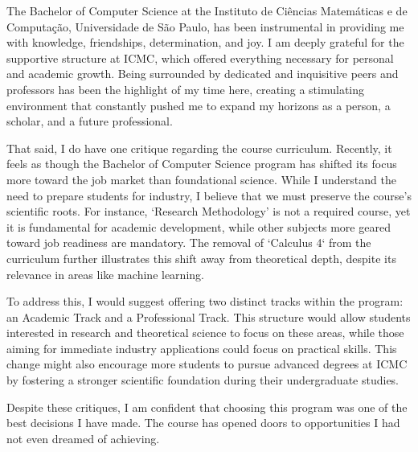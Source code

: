 The Bachelor of Computer Science at the Instituto de Ciências Matemáticas e de Computação, Universidade de São Paulo, has been instrumental in providing me with knowledge, friendships, determination, and joy. I am deeply grateful for the supportive structure at ICMC, which offered everything necessary for personal and academic growth. Being surrounded by dedicated and inquisitive peers and professors has been the highlight of my time here, creating a stimulating environment that constantly pushed me to expand my horizons as a person, a scholar, and a future professional.

That said, I do have one critique regarding the course curriculum. Recently, it feels as though the Bachelor of Computer Science program has shifted its focus more toward the job market than foundational science. While I understand the need to prepare students for industry, I believe that we must preserve the course's scientific roots. For instance, `Research Methodology' is not a required course, yet it is fundamental for academic development, while other subjects more geared toward job readiness are mandatory. The removal of `Calculus 4` from the curriculum further illustrates this shift away from theoretical depth, despite its relevance in areas like machine learning.

To address this, I would suggest offering two distinct tracks within the program: an Academic Track and a Professional Track. This structure would allow students interested in research and theoretical science to focus on these areas, while those aiming for immediate industry applications could focus on practical skills. This change might also encourage more students to pursue advanced degrees at ICMC by fostering a stronger scientific foundation during their undergraduate studies.

Despite these critiques, I am confident that choosing this program was one of the best decisions I have made. The course has opened doors to opportunities I had not even dreamed of achieving.
